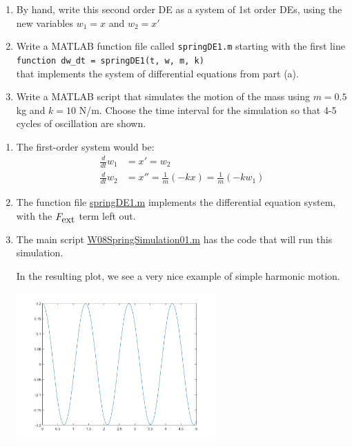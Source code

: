 \begin{enumerate}
\begin{Question}
\begin{enumerate}
\item By hand, write this second order DE as a system of 1st order
  DEs, using the new variables $w_1 = x$ and $w_2 = x'$

\item Write a MATLAB function file called \verb#springDE1.m# starting
  with the first line \\
  \verb#function dw_dt = springDE1(t, w, m, k)# \\
  that implements the system of differential equations from part (a).
\item Write a MATLAB script that simulates the motion of the mass
  using $m = 0.5$ kg and $k = 10$ N/m.  Choose the time interval for
  the simulation so that 4-5 cycles of oscillation are shown.
\end{enumerate}
\end{Question}

\begin{Solution}
 \begin{enumerate}
 \item  The first-order system would be:
 \begin{align*}
 \frac{d}{dt} w_1 & = x' = w_2 \\
 \frac{d}{dt} w_2 & = x'' = \frac{1}{m} \left(-kx \right) = \frac{1}{m} \left(-k w_1  \right)
 \end{align*}

\item The function file  
  \href{http://www.mast.queensu.ca/~apsc171/MNTCP01/PracticeProblems/MATLAB/springDE1.m}{springDE1.m} 
  implements the differential equation system, with the $F_{\mbox{ext}} $ term
  left out.

\item The main script
\href{http://www.mast.queensu.ca/~apsc171/MNTCP01/PracticeProblems/MATLAB/W08SpringSimulation01.m}{W08SpringSimulation01.m} 
has the code that will run this simulation.

In the resulting plot, we see a very nice example of simple harmonic
motion.

\begin{center}
\includegraphics[width=3in]{graphics/Week08_Spring/W08SpringSimulation01}
\end{center}


\end{enumerate}
\end{Solution}
\end{enumerate}
